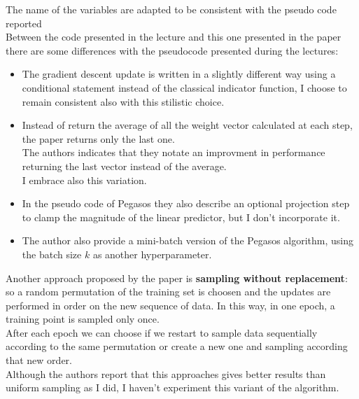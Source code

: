 The name of the variables are adapted to be consistent with the pseudo code reported\\
Between the code presented in the lecture and this one presented in the paper there are some differences with the pseudocode presented during the lectures:\\
\begin{itemize}
    \item The gradient descent update is written in a slightly different way using a conditional statement instead of the classical indicator function, I choose to remain consistent also with this stilistic choice.\\
    \item Instead of return the average of all the weight vector calculated at each step, the paper returns only the last one.\\ 
    The authors indicates that they notate an improvment in performance returning the last vector instead of the average.\\ 
    I embrace also this variation.\\
    \item In the pseudo code of Pegasos they also describe an optional projection step to clamp the magnitude of the linear predictor, but I don't incorporate it.\\ 
    \item The author also provide a mini-batch version of the Pegasos algorithm, using the batch size $k$ as another hyperparameter.\\
\end{itemize}

Another approach proposed by the paper is {\bf sampling without replacement}: so a random permutation of the training set is choosen and the updates are performed in order on the new sequence of data.
In this way, in one epoch, a training point is sampled only once.\\
After each epoch we can choose if we restart to sample data sequentially according to the same permutation or create a new one and sampling according that new order.\\
Although the authors report that this approaches gives better results than uniform sampling as I did, I haven't experiment this variant of the algorithm.\\

